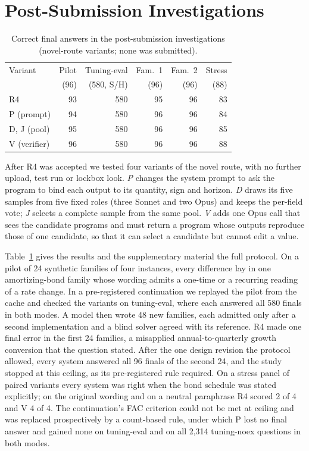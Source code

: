 \documentclass[conference]{IEEEtran}
\begin{document}
\section{Post-Submission Investigations}\label{sec:post}
\begin{table}[t]
\caption{Correct final answers in the post-submission investigations (novel-route variants; none was submitted).}
\label{tab:post}
\centering
\scriptsize
\setlength{\tabcolsep}{4pt}
\begin{tabular}{@{}lrrrrr@{}}
\toprule
Variant & Pilot & Tuning-eval & Fam.\ 1 & Fam.\ 2 & Stress \\
 & (96) & (580, S/H) & (96) & (96) & (88) \\
\midrule
R4 & 93 & 580 & 95 & 96 & 83 \\
P (prompt) & 94 & 580 & 96 & 96 & 84 \\
D, J (pool) & 95 & 580 & 96 & 96 & 85 \\
V (verifier) & 96 & 580 & 96 & 96 & 88 \\
\bottomrule
\end{tabular}
\end{table}
After R4 was accepted we tested four variants of the novel route, with no further upload, test run or lockbox look. \emph{P} changes the system prompt to ask the program to bind each output to its quantity, sign and horizon. \emph{D} draws its five samples from five fixed roles (three Sonnet and two Opus) and keeps the per-field vote; \emph{J} selects a complete sample from the same pool. \emph{V} adds one Opus call that sees the candidate programs and must return a program whose outputs reproduce those of one candidate, so that it can select a candidate but cannot edit a value.

Table~\ref{tab:post} gives the results and the supplementary material the full protocol. On a pilot of 24 synthetic families of four instances, every difference lay in one amortizing-bond family whose wording admits a one-time or a recurring reading of a rate change. In a pre-registered continuation we replayed the pilot from the cache and checked the variants on tuning-eval, where each answered all 580 finals in both modes. A model then wrote 48 new families, each admitted only after a second implementation and a blind solver agreed with its reference. R4 made one final error in the first 24 families, a misapplied annual-to-quarterly growth conversion that the question stated. After the one design revision the protocol allowed, every system answered all 96 finals of the second 24, and the study stopped at this ceiling, as its pre-registered rule required. On a stress panel of paired variants every system was right when the bond schedule was stated explicitly; on the original wording and on a neutral paraphrase R4 scored 2 of 4 and V 4 of 4. The continuation's FAC criterion could not be met at ceiling and was replaced prospectively by a count-based rule, under which P lost no final answer and gained none on tuning-eval and on all 2,314 tuning-noex questions in both modes.
\end{document}
